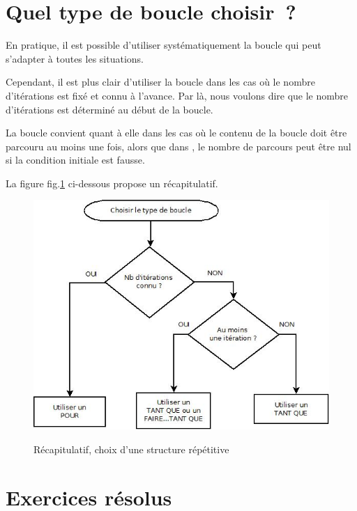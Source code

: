\section{Quel type de boucle choisir~?}

	En pratique, il est possible d’utiliser systématiquement la boucle  qui peut s’adapter à toutes les situations.  
	
	Cependant, il est plus clair d’utiliser la boucle  dans les cas où
	le nombre d’itérations est fixé et connu à l’avance. Par là, nous voulons
	dire que le nombre d’itérations est déterminé au début de la boucle.  
	
	La boucle  convient quant à elle dans les cas où le
	contenu de la boucle doit être parcouru au moins une fois, alors que dans
	, le nombre de parcours peut être nul si la condition initiale
	est fausse.  
	
	La figure fig.\ref{fig:boucle-choix} ci-dessous propose un récapitulatif.

	\begin{center}
		\begin{figure}[h]
			\centering
			\includegraphics[width=.8\textwidth]{images/boucle-choixtype}
			\label{fig:boucle-choix}
			\caption{Récapitulatif, choix d'une structure répétitive}
		\end{figure}
	\end{center}




\section{Exercices résolus}

